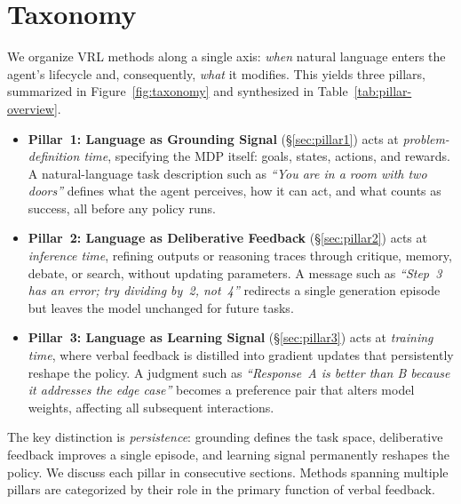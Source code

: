 \section{Taxonomy}
\label{sec:taxonomy}
We organize VRL methods along a single axis: \emph{when} natural language enters the agent's lifecycle and, consequently, \emph{what} it modifies. This yields three pillars, summarized in Figure~\ref{fig:taxonomy} and synthesized in Table~\ref{tab:pillar-overview}.

\begin{itemize}
    \setlength\itemsep{0.25em}
    \item \textbf{Pillar~1: Language as Grounding Signal} (\S\ref{sec:pillar1}) acts at \emph{problem-definition time}, specifying the MDP \citep{sutton1998reinforcement} itself: goals, states, actions, and rewards. A natural-language task description such as \textit{``You are in a room with two doors''} defines what the agent perceives, how it can act, and what counts as success, all before any policy runs.
    \item \textbf{Pillar~2: Language as Deliberative Feedback} (\S\ref{sec:pillar2}) acts at \emph{inference time}, refining outputs or reasoning traces through critique, memory, debate, or search, without updating parameters. A message such as \textit{``Step~3 has an error; try dividing by~2, not~4''} redirects a single generation episode but leaves the model unchanged for future tasks.
    \item \textbf{Pillar~3: Language as Learning Signal} (\S\ref{sec:pillar3}) acts at \emph{training time}, where verbal feedback is distilled into gradient updates that persistently reshape the policy. A judgment such as \textit{``Response~A is better than B because it addresses the edge case''} becomes a preference pair that alters model weights, affecting all subsequent interactions.
\end{itemize}

\noindent The key distinction is \emph{persistence}: grounding defines the task space, deliberative feedback improves a single episode, and learning signal permanently reshapes the policy. We discuss each pillar in consecutive sections. Methods spanning multiple pillars are categorized by their role in the primary function of verbal feedback.

